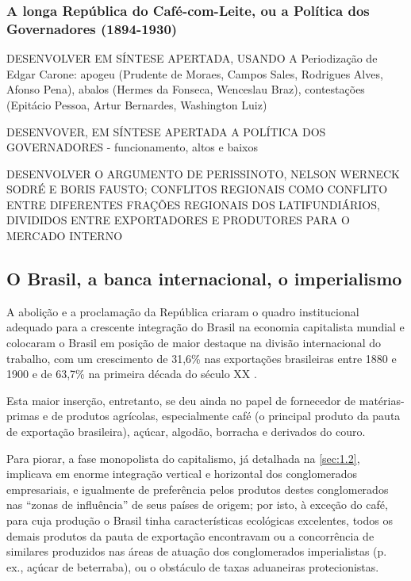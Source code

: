 \subsubsection{A longa República do Café-com-Leite, ou a Política dos Governadores (1894-1930)}\label{subsubsec:cafeleite}

DESENVOLVER EM SÍNTESE APERTADA, USANDO A Periodização de Edgar Carone: apogeu (Prudente de Moraes, Campos Sales, Rodrigues Alves, Afonso Pena), abalos (Hermes da Fonseca, Wenceslau Braz), contestações (Epitácio Pessoa, Artur Bernardes, Washington Luiz) \cite{carone_evolucao_1977}

DESENVOVER, EM SÍNTESE APERTADA A POLÍTICA DOS GOVERNADORES - funcionamento, altos e baixos 

DESENVOLVER O ARGUMENTO DE PERISSINOTO, NELSON WERNECK SODRÉ E BORIS FAUSTO; CONFLITOS REGIONAIS COMO CONFLITO ENTRE DIFERENTES FRAÇÕES REGIONAIS DOS LATIFUNDIÁRIOS, DIVIDIDOS ENTRE EXPORTADORES E PRODUTORES PARA O MERCADO INTERNO

\subsection{O Brasil, a banca internacional, o imperialismo}\label{subsec:brasimper}

A abolição e a proclamação da República criaram o quadro institucional adequado para a crescente integração do Brasil na economia capitalista mundial e colocaram o Brasil em posição de maior destaque na divisão internacional do trabalho, com um crescimento de 31,6\% nas exportações brasileiras entre 1880 e 1900 e de 63,7\% na primeira década do século XX \cite[p.~352]{singer_braecomu_1977}. 

Esta maior inserção, entretanto, se deu ainda no papel de fornecedor de matérias-primas e de produtos agrícolas, especialmente café (o principal produto da pauta de exportação brasileira), açúcar, algodão, borracha e derivados do couro.





Para piorar, a fase monopolista do capitalismo, já detalhada na \autoref{sec:1.2}, implicava em enorme integração vertical e horizontal dos conglomerados empresariais, e igualmente de preferência pelos produtos destes conglomerados nas ``zonas de influência'' de seus países de origem; por isto, à exceção do café, para cuja produção o Brasil tinha características ecológicas excelentes, todos os demais produtos da pauta de exportação encontravam ou a concorrência de similares produzidos nas áreas de atuação dos conglomerados imperialistas (p. ex., açúcar de beterraba), ou o obstáculo de taxas aduaneiras protecionistas.

